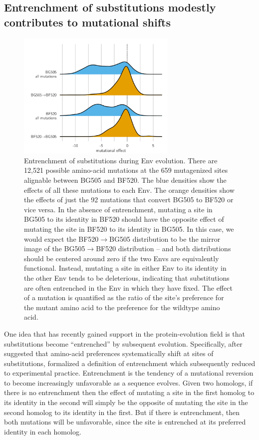 \documentclass[9pt]{elife}
\begin{document}
\subsection{Entrenchment of substitutions modestly contributes to mutational shifts}

\begin{figure}
\centerline{\includegraphics[clip=true, trim=0in 0in 0in 0.7in, width=0.68\textwidth]{figures/entrenchment.pdf}}
\caption{\label{fig:entrenchment}
Entrenchment of substitutions during Env evolution.
There are 12,521 possible amino-acid mutations at the 659 mutagenized sites alignable between BG505 and BF520.
The blue densities show the effects of all these mutations to each Env.
The orange densities show the effects of just the 92 mutations that convert BG505 to BF520 or vice versa.
In the absence of entrenchment, mutating a site in BG505 to its identity in BF520 should have the opposite effect of mutating the site in BF520 to its identity in BG505.
In this case, we would expect the BF520$\rightarrow$BG505 distribution to be the mirror image of the BG505$\rightarrow$BF520 distribution -- and both distributions should be centered around zero if the two Envs are equivalently functional.
Instead, mutating a site in either Env to its identity in the other Env tends to be deleterious, indicating that substitutions are often entrenched in the Env in which they have fixed.
The effect of a mutation is quantified as the ratio of the site's preference for the mutant amino acid to the preference for the wildtype amino acid.
}
\end{figure}

One idea that has recently gained support in the protein-evolution field is that substitutions become ``entrenched'' by subsequent evolution.
Specifically, after \citet{pollock2012amino} suggested that amino-acid preferences systematically shift at sites of substitutions, \citet{shah2015contingency} formalized a definition of entrenchment which \citet{starr2017pervasive} subsequently reduced to experimental practice.
Entrenchment is the tendency of a mutational reversion to become increasingly unfavorable as a sequence evolves.
Given two homologs, if there is no entrenchment then the effect of mutating a site in the first homolog to its identity in the second will simply be the opposite of mutating the site in the second homolog to its identity in the first.
But if there is entrenchment, then both mutations will be unfavorable, since the site is entrenched at its preferred identity in each homolog.
\end{document}
